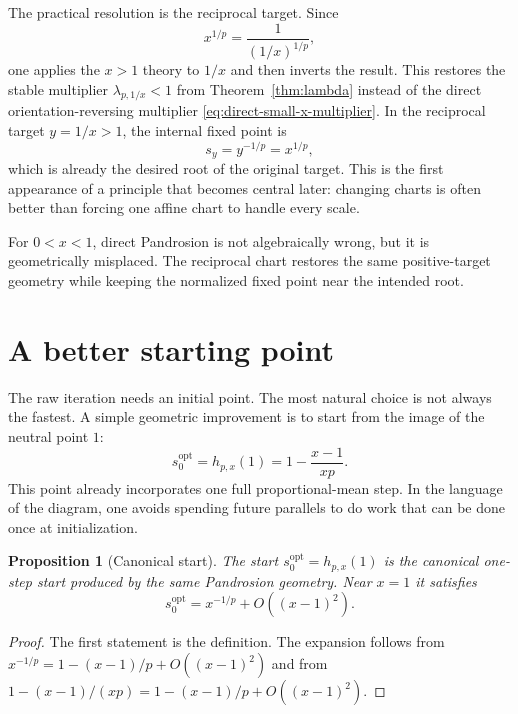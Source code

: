 \documentclass[10pt,a4paper]{article}
\theoremstyle{plain}
\newtheorem{proposition}[theorem]{Proposition}
\theoremstyle{definition}
\theoremstyle{remark}
\newcommand{\hp}{h_{p,x}}
\newenvironment{takeaway}{%
  \begin{center}\begin{minipage}{0.92\linewidth}\small\itshape\color{blue!45!black}%
}{%
  \end{minipage}\end{center}%
}
\begin{document}
The practical resolution is the reciprocal target.  Since
\[
  x^{1/p}=\frac{1}{(1/x)^{1/p}},
\]
one applies the $x>1$ theory to $1/x$ and then inverts the result.  This
restores the stable multiplier $\lambda_{p,1/x}<1$ from
Theorem~\ref{thm:lambda} instead of the direct orientation-reversing multiplier
\eqref{eq:direct-small-x-multiplier}.  In the reciprocal target $y=1/x>1$, the
internal fixed point is
\[
  s_y=y^{-1/p}=x^{1/p},
\]
which is already the desired root of the original target.  This is the first
appearance of a principle that becomes central later: changing charts is often
better than forcing one affine chart to handle every scale.

\begin{takeaway}
For $0<x<1$, direct Pandrosion is not algebraically wrong, but it is
geometrically misplaced.  The reciprocal chart restores the same positive-target
geometry while keeping the normalized fixed point near the intended root.
\end{takeaway}

\section{A better starting point}
\label{sec:start}

The raw iteration needs an initial point.  The most natural choice is not
always the fastest.  A simple geometric improvement is to start from the image
of the neutral point $1$:
\begin{equation}
  s_0^{\mathrm{opt}}=\hp(1)=1-\frac{x-1}{xp}.
  \label{eq:startopt}
\end{equation}
This point already incorporates one full proportional-mean step.  In the
language of the diagram, one avoids spending future parallels to do work that
can be done once at initialization.

\begin{proposition}[Canonical start]
The start $s_0^{\mathrm{opt}}=\hp(1)$ is the canonical one-step start produced
by the same Pandrosion geometry.  Near $x=1$ it satisfies
\[
  s_0^{\mathrm{opt}}=x^{-1/p}+O((x-1)^2).
\]
\end{proposition}

\begin{proof}
The first statement is the definition.  The expansion follows from
$x^{-1/p}=1-(x-1)/p+O((x-1)^2)$ and from
$1-(x-1)/(xp)=1-(x-1)/p+O((x-1)^2)$.
\end{proof}
\end{document}

